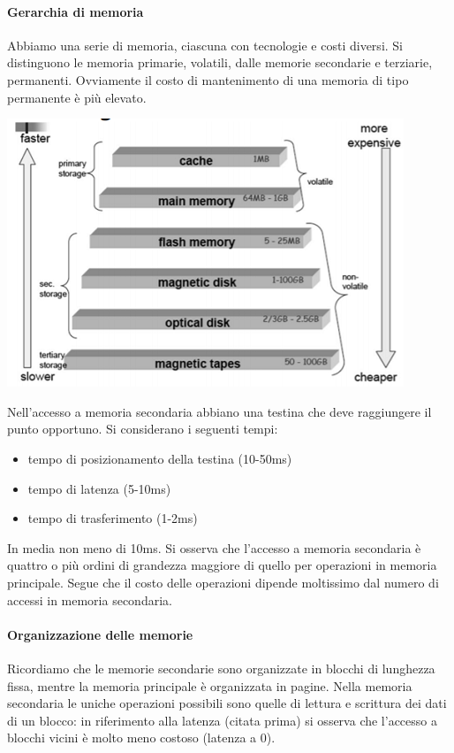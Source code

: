 \paragraph{Gerarchia di memoria}Abbiamo una serie di memoria, ciascuna con tecnologie e costi diversi. Si distinguono le memoria primarie, volatili, dalle memorie secondarie e terziarie, permanenti. Ovviamente il costo di mantenimento di una memoria di tipo permanente è più elevato.
\begin{center}\includegraphics{images/176.PNG}\end{center}
Nell'accesso a memoria secondaria abbiano una testina che deve raggiungere il punto opportuno. Si considerano i seguenti tempi:
\begin{itemize}
	\item tempo di posizionamento della testina (10-50ms)
	\item tempo di latenza (5-10ms)
	\item tempo di trasferimento (1-2ms)
\end{itemize}
In media non meno di 10ms. Si osserva che l'accesso a memoria secondaria è quattro o più ordini di grandezza maggiore di quello per operazioni in memoria principale. Segue che il costo delle operazioni dipende moltissimo dal numero di accessi in memoria secondaria.
\paragraph{Organizzazione delle memorie} Ricordiamo che le memorie secondarie sono organizzate in blocchi di lunghezza fissa, mentre la memoria principale è organizzata in pagine. Nella memoria secondaria  le uniche operazioni possibili sono quelle di lettura e scrittura dei dati di un blocco: in riferimento alla latenza (citata prima) si osserva che l'accesso a blocchi vicini è molto meno costoso (latenza a 0).
